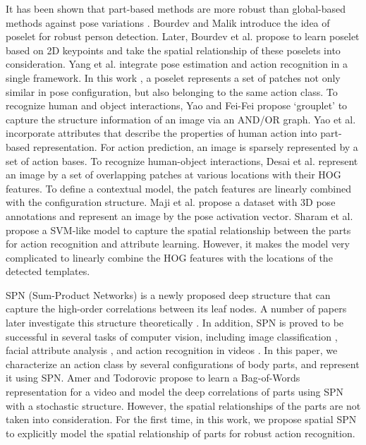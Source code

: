 \documentclass[journal]{IEEEtran}
\begin{document}
It has been shown that part-based methods are more robust than global-based methods against pose variations \cite{YangWMCVPR10,FelzenszwalbMR_CVPR_2008}. Bourdev and Malik \cite{BourdevMalikICCV09} introduce the idea of poselet for robust person detection.          
Later, Bourdev \cite{BourdevPoseletsECCV10} et al. propose to learn poselet based on 2D keypoints and take the spatial relationship of these poselets into consideration. Yang et al. \cite{YangWMCVPR10} integrate pose estimation and action recognition in a single framework. In this work \cite{YangWMCVPR10}, a poselet represents a set of patches not only similar in pose configuration, but also belonging to the same action class. To recognize human and object interactions, Yao and Fei-Fei \cite{GroupletYaoBangpengFeifeiLI} propose `grouplet' to capture the structure information of an image via an AND/OR graph.  Yao et al. \cite{Yao11humanaction__Stanford40} incorporate attributes that describe the properties of human action into part-based representation. For action prediction, an image is sparsely represented by a set of action bases. To recognize human-object interactions, Desai et al. \cite{desai10_action} represent an image by a set of overlapping patches at various locations with their HOG features. To define a contextual model, the patch features are linearly combined with the configuration structure. Maji et al. \cite{MajiActionCVPR11} propose a dataset with 3D pose annotations and represent an image by the pose activation vector. Sharam et al. \cite{sharma:CVPR2013} propose a SVM-like model to capture the spatial relationship between the parts for action recognition and attribute learning. However, it makes the model very complicated to linearly combine the HOG features with the locations of the detected templates.



SPN (Sum-Product Networks) \cite{poon2011SPNIntroduce} is a newly proposed deep structure that can capture the high-order correlations between its leaf nodes. A number of papers later investigate this structure theoretically \cite{Delalleau11shallowvs,DirectIndirectSPNicml2014c1_rooshenas14}. In addition, SPN is proved to be successful in several tasks of computer vision, including image classification \cite{Discriminative_Learning_SPNNIPS2012_4516}, facial attribute analysis \cite{SPNWangXiaogangFacial}, and action recognition in videos \cite{SPN_video_action}. 
In this paper, we characterize an action class by several configurations of body parts, and represent it using SPN.
Amer and Todorovic \cite{SPN_video_action} propose to learn a Bag-of-Words representation for a video and model the deep correlations of parts using SPN with a stochastic structure. However, the spatial relationships of the parts are not taken into consideration. 
For the first time, in this work, we propose spatial SPN to explicitly model the spatial relationship of parts for robust action recognition. 
\end{document}
